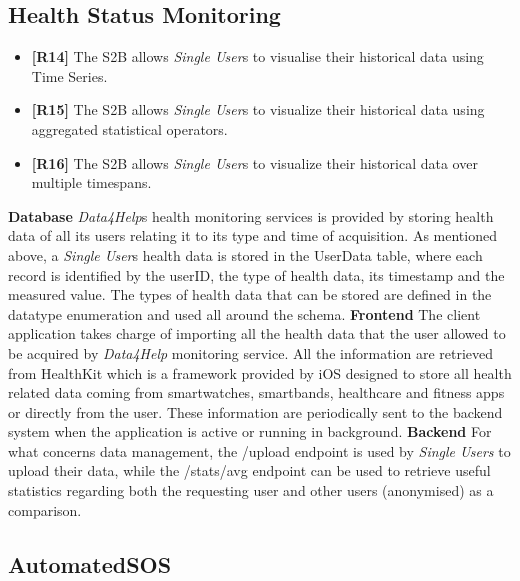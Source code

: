 \documentclass[titlepage]{article}
\begin{document}
	
	\subsection{Health Status Monitoring}
	\begin{itemize}
		\item {\bf [R14]} The S2B allows {\it Single User}s to visualise their historical data using Time Series. 
		\item {\bf [R15]} The S2B allows {\it Single User}s to visualize their historical data using aggregated statistical operators. 
		\item {\bf [R16]} The S2B allows {\it Single User}s to visualize their historical data over multiple timespans.
	\end{itemize}	
	\noindent
	{\bf Database} \newline
	{\it Data4Help}\textsc{}s health monitoring services is provided by storing health data of all its users relating it to its type and time of acquisition. As mentioned above, a {\it Single User}\textsc{}s health data is stored in the UserData table, where each record is identified by the userID, the type of health data, its timestamp and the measured value. The types of health data that can be stored are defined in the datatype enumeration and used all around the schema.
	\newline
	\newline
	\noindent
	{\bf Frontend} \newline
	The client application takes charge of importing all the health data that the user allowed to be acquired by {\it Data4Help} monitoring service. All the information are retrieved from HealthKit which is a framework provided by iOS designed to store all health related data coming from smartwatches, smartbands, healthcare and fitness apps or directly from the user. These information are periodically sent to the backend system when the application is active or running in background.
	\newline
	\newline
	\noindent
	{\bf Backend} \newline
	For what concerns data management, the /upload endpoint is used by {\it Single Users} to upload their data, while the /stats/avg endpoint can be used to retrieve useful statistics regarding both the requesting user and other users (anonymised) as a comparison.
	
	
	\subsection{AutomatedSOS}
	
\end{document}
